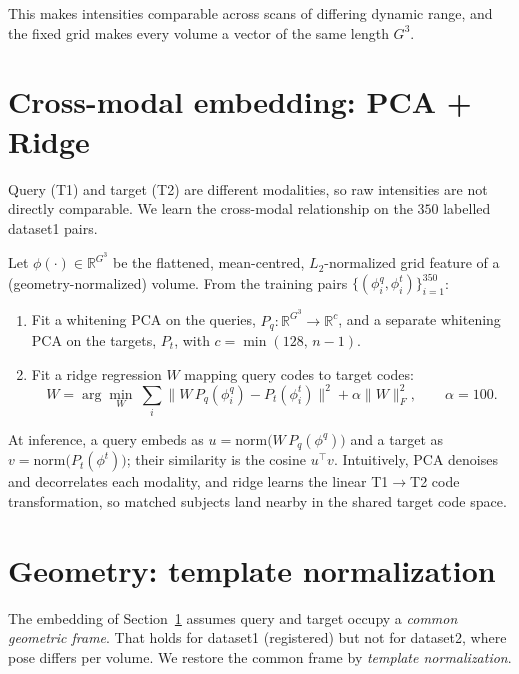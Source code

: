 \documentclass[11pt]{article}
\newcommand{\R}{\mathbb{R}}
\begin{document}
This makes intensities comparable across scans of differing dynamic range, and the
fixed grid makes every volume a vector of the same length $G^3$.

\section{Cross-modal embedding: PCA + Ridge}\label{sec:embed}

Query (T1) and target (T2) are different modalities, so raw intensities are not
directly comparable. We learn the cross-modal relationship on the $350$ labelled
dataset1 pairs.

Let $\phi(\cdot)\in\R^{G^3}$ be the flattened, mean-centred, $L_2$-normalized grid
feature of a (geometry-normalized) volume. From the training pairs
$\{(\phi^q_i,\phi^t_i)\}_{i=1}^{350}$:

\begin{enumerate}[nosep]
  \item Fit a whitening PCA on the queries, $P_q:\R^{G^3}\!\to\R^{c}$, and a separate
        whitening PCA on the targets, $P_t$, with $c=\min(128,\,n-1)$.
  \item Fit a ridge regression $W$ mapping query codes to target codes:
        \begin{equation}
          W=\arg\min_{W}\ \sum_i \big\|W\,P_q(\phi^q_i)-P_t(\phi^t_i)\big\|^2
          +\alpha\|W\|_F^2,\qquad \alpha=100 .
        \end{equation}
\end{enumerate}

At inference, a query embeds as $u = \mathrm{norm}\!\big(W\,P_q(\phi^q)\big)$ and a
target as $v = \mathrm{norm}\!\big(P_t(\phi^t)\big)$; their similarity is the cosine
$u^\top v$. Intuitively, PCA denoises and decorrelates each modality, and ridge
learns the linear T1$\to$T2 code transformation, so matched subjects land nearby in
the shared target code space.

\section{Geometry: template normalization}\label{sec:template}

The embedding of Section~\ref{sec:embed} assumes query and target occupy a
\emph{common geometric frame}. That holds for dataset1 (registered) but not for
dataset2, where pose differs per volume. We restore the common frame by
\emph{template normalization}.
\end{document}
